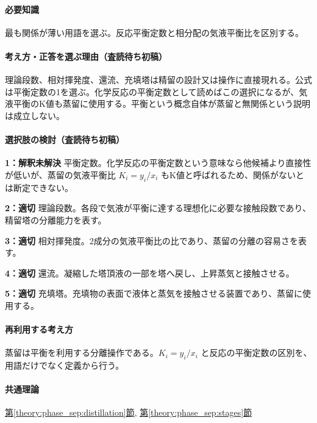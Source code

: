 \paragraph{必要知識} 最も関係が薄い用語を選ぶ。反応平衡定数と相分配の気液平衡比を区別する。

\paragraph{考え方・正答を選ぶ理由（査読待ち初稿）} 理論段数、相対揮発度、還流、充填塔は精留の設計又は操作に直接現れる。公式は平衡定数の1を選ぶ。化学反応の平衡定数として読めばこの選択になるが、気液平衡のK値も蒸留に使用する。平衡という概念自体が蒸留と無関係という説明は成立しない。

\paragraph{選択肢の検討（査読待ち初稿）}\mbox{}\par

\noindent\textbf{1：解釈未解決} 平衡定数。化学反応の平衡定数という意味なら他候補より直接性が低いが、蒸留の気液平衡比 \(K_i=y_i/x_i\) もK値と呼ばれるため、関係がないとは断定できない。\par

\noindent\textbf{2：適切} 理論段数。各段で気液が平衡に達する理想化に必要な接触段数であり、精留塔の分離能力を表す。\par

\noindent\textbf{3：適切} 相対揮発度。2成分の気液平衡比の比であり、蒸留の分離の容易さを表す。\par

\noindent\textbf{4：適切} 還流。凝縮した塔頂液の一部を塔へ戻し、上昇蒸気と接触させる。\par

\noindent\textbf{5：適切} 充填塔。充填物の表面で液体と蒸気を接触させる装置であり、蒸留に使用する。\par

\paragraph{再利用する考え方} 蒸留は平衡を利用する分離操作である。\(K_i=y_i/x_i\) と反応の平衡定数の区別を、用語だけでなく定義から行う。

\paragraph{共通理論} \hyperref[theory:phase_sep:distillation]{第\ref*{theory:phase_sep:distillation}節}, \hyperref[theory:phase_sep:stages]{第\ref*{theory:phase_sep:stages}節}

